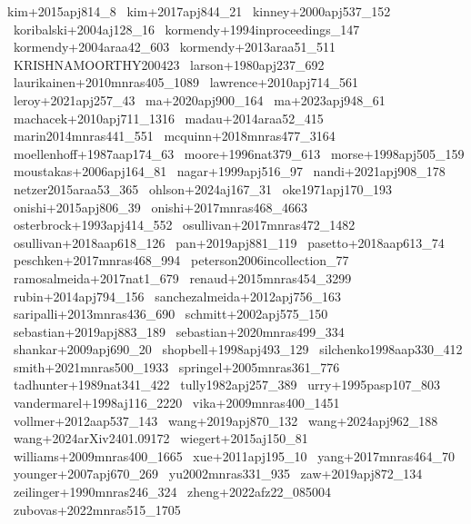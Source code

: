 \documentclass{article}
\begin{document}
\noindent kim+2015apj814_8 \
\noindent kim+2017apj844_21 \
\noindent kinney+2000apj537_152 \
\noindent koribalski+2004aj128_16 \
\noindent kormendy+1994inproceedings_147 \
\noindent kormendy+2004araa42_603 \
\noindent kormendy+2013araa51_511 \
\noindent KRISHNAMOORTHY200423 \
\noindent larson+1980apj237_692 \
\noindent laurikainen+2010mnras405_1089 \
\noindent lawrence+2010apj714_561 \
\noindent leroy+2021apj257_43 \
\noindent ma+2020apj900_164 \
\noindent ma+2023apj948_61 \
\noindent machacek+2010apj711_1316 \
\noindent madau+2014araa52_415 \
\noindent marin2014mnras441_551 \
\noindent mcquinn+2018mnras477_3164 \
\noindent moellenhoff+1987aap174_63 \
\noindent moore+1996nat379_613 \
\noindent morse+1998apj505_159 \
\noindent moustakas+2006apj164_81 \
\noindent nagar+1999apj516_97 \
\noindent nandi+2021apj908_178 \
\noindent netzer2015araa53_365 \
\noindent ohlson+2024aj167_31 \
\noindent oke1971apj170_193 \
\noindent onishi+2015apj806_39 \
\noindent onishi+2017mnras468_4663 \
\noindent osterbrock+1993apj414_552 \
\noindent osullivan+2017mnras472_1482 \
\noindent osullivan+2018aap618_126 \
\noindent pan+2019apj881_119 \
\noindent pasetto+2018aap613_74 \
\noindent peschken+2017mnras468_994 \
\noindent peterson2006incollection_77 \
\noindent ramosalmeida+2017nat1_679 \
\noindent renaud+2015mnras454_3299 \
\noindent rubin+2014apj794_156 \
\noindent sanchezalmeida+2012apj756_163 \
\noindent saripalli+2013mnras436_690 \
\noindent schmitt+2002apj575_150 \
\noindent sebastian+2019apj883_189 \
\noindent sebastian+2020mnras499_334 \
\noindent shankar+2009apj690_20 \
\noindent shopbell+1998apj493_129 \
\noindent silchenko1998aap330_412 \
\noindent smith+2021mnras500_1933 \
\noindent springel+2005mnras361_776 \
\noindent tadhunter+1989nat341_422 \
\noindent tully1982apj257_389 \
\noindent urry+1995pasp107_803 \
\noindent vandermarel+1998aj116_2220 \
\noindent vika+2009mnras400_1451 \
\noindent vollmer+2012aap537_143 \
\noindent wang+2019apj870_132 \
\noindent wang+2024apj962_188 \
\noindent wang+2024arXiv2401.09172 \
\noindent wiegert+2015aj150_81 \
\noindent williams+2009mnras400_1665 \
\noindent xue+2011apj195_10 \
\noindent yang+2017mnras464_70 \
\noindent younger+2007apj670_269 \
\noindent yu2002mnras331_935 \
\noindent zaw+2019apj872_134 \
\noindent zeilinger+1990mnras246_324 \
\noindent zheng+2022afz22_085004 \
\noindent zubovas+2022mnras515_1705 \
\end{document}
